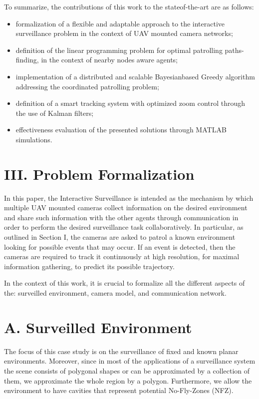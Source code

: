 \documentclass[conference]{IEEEtran}
\begin{document}
To summarize, the contributions of this work to the stateof-the-art are as follows:

\begin{itemize}
  \item formalization of a flexible and adaptable approach to the interactive surveillance problem in the context of UAV mounted camera networks;
  \item definition of the linear programming problem for optimal patrolling paths-finding, in the context of nearby nodes aware agents;
  \item implementation of a distributed and scalable Bayesianbased Greedy algorithm addressing the coordinated patrolling problem;
  \item definition of a smart tracking system with optimized zoom control through the use of Kalman filters;
  \item effectiveness evaluation of the presented solutions through MATLAB simulations.
\end{itemize}

\section*{III. Problem Formalization}
In this paper, the Interactive Surveillance is intended as the mechanism by which multiple UAV mounted cameras collect information on the desired environment and share such information with the other agents through communication in order to perform the desired surveillance task collaboratively. In particular, as outlined in Section I, the cameras are asked to patrol a known environment looking for possible events that may occur. If an event is detected, then the cameras are required to track it continuously at high resolution, for maximal information gathering, to predict its possible trajectory.

In the context of this work, it is crucial to formalize all the different aspects of the: surveilled environment, camera model, and communication network.

\section*{A. Surveilled Environment}
The focus of this case study is on the surveillance of fixed and known planar environments. Moreover, since in most of the applications of a surveillance system the scene consists of polygonal shapes or can be approximated by a collection of them, we approximate the whole region by a polygon. Furthermore, we allow the environment to have cavities that represent potential No-Fly-Zones (NFZ).
\end{document}
